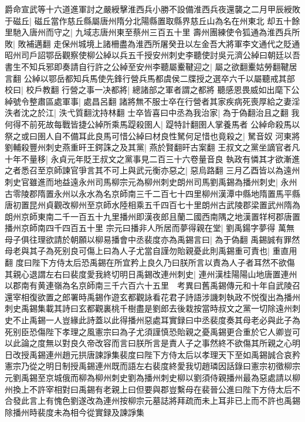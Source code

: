 爵命宣武等十六道進軍討之嚴綬擊淮西兵小勝不設備淮西兵夜還襲之二月甲辰綬敗于磁丘|{
	磁丘當作慈丘縣屬唐州隋分北陽縣置取縣界慈丘山為名在州東北}
却五十餘里馳入唐州而守之|{
	九域志唐州東至蔡州三百五十里}
壽州團練使令狐通為淮西兵所敗|{
	敗補邁翻}
走保州城境上諸柵盡為淮西所屠癸丑以左金吾大將軍李文通代之貶通昭州司戶詔鄂岳觀察使柳公綽以兵五千授安州刺史李聽使討吳元濟公綽曰朝廷以吾書生不知兵邪即奏請自行許之公綽至安州李聽屬櫜鞬迎之|{
	屬之欲翻櫜姑勞翻鞬居言翻}
公綽以鄂岳都知兵馬使先鋒行營兵馬都虞侯二牒授之選卒六千以屬聽戒其部校曰|{
	校戶教翻}
行營之事一决都將|{
	總諸部之軍者謂之都將}
聽感恩畏威如出麾下公綽號令整肅區處軍事|{
	處昌呂翻}
諸將無不服士卒在行營者其家疾病死喪厚給之妻淫泆者沈之於江|{
	泆弋質翻沈持林翻}
士卒皆喜曰中丞為我治家|{
	為于偽翻治且之翻}
我何得不前死故每戰皆捷公綽所乘馬踶殺圉人|{
	踶特計翻圉人掌養馬者}
公綽命殺馬以祭之或曰圉人自不備耳此良馬可惜公綽曰材良性駑何足惜也竟殺之|{
	駑音奴}
河東將劉輔殺豐州刺史燕重旰王鍔誅之及其黨|{
	燕於賢翻旰古案翻}
王叔文之黨坐謫官者凡十年不量移|{
	永貞元年貶王叔文之黨事見二百三十六卷量音良}
執政有憐其才欲漸進之者悉召至京師諫官爭言其不可上與武元衡亦惡之|{
	惡烏路翻}
三月乙酉皆以為遠州刺史官雖進而地益遠永州司馬柳宗元為柳州刺史朗州司馬劉禹錫為播州刺史|{
	永州古零陵郡隋置永州以永水為名京師南三千二百七十四里柳州漢潭中縣地隋置馬平縣唐初置昆州貞觀改柳州至京師水陸相乘五千四百七十里朗州古武陵郡梁置武州隋為朗州京師東南二千一百五十九里播州即漢夜郎且蘭二國西南隅之地漢置䍧柯郡唐置播州京師南四千四百五十里}
宗元曰播非人所居而夢得親在堂|{
	劉禹鍚字夢得}
萬無母子俱往理欲請於朝願以柳易播會中丞裴度亦為禹錫言曰|{
	為于偽翻}
禹錫誠有罪然母老與其子為死别良可傷上曰為人子尤當自謹勿貽親憂此則禹錫重可責也|{
	重直用翻}
度曰陛下方侍太后恐禹錫在所宜矜上良久乃曰朕所言以責為人子者耳然不欲傷其親心退謂左右曰裴度愛我終切明日禹錫改連州刺史|{
	連州漢桂陽陽山地唐置連州以郡南有黄連嶺為名京師南三千六百六十五里　考異曰舊禹錫傳元和十年自武陵召還宰相復欲置之郎署時禹錫作遊玄都觀詠看花君子詩語涉譏刺執政不悦復出為播州刺史禹錫集載其詩曰玄都觀裏桃千樹盡是劉郎去後栽按當時叔文之黨一切除遠州刺史不止禹錫一人豈緣此詩蓋以此得播州惡處耳實録曰中丞裴度奏其母老必與此子為死别臣恐傷陛下孝理之風憲宗曰為子尤須謹慎恐貽親之憂禹錫更合重於它人卿豈可以此論之度無以對良久帝改容而言曰朕所言是責人子之事然終不欲傷其所親之心明日改授禹錫連州趙元拱唐諫諍集裴度曰陛下方侍太后以孝理天下至如禹錫誠合哀矜憲宗乃從之明日制授禹錫連州既而語左右裴度終愛我切趙璘因話錄曰憲宗初徵柳宗元劉禹錫至京城俄而柳為柳州刺史劉為播州刺史柳以劉須侍親播州最為惡處請以柳州換上不許宰相對曰禹錫有老親上曰但要與郡豈繫母在裴晉公進曰陛下方侍太后不合發此言上有愧色劉遂改為連州按柳宗元墓誌將拜疏而未上耳非已上而不許也禹錫除播州時裴度未為相今從實録及諫諍集}
